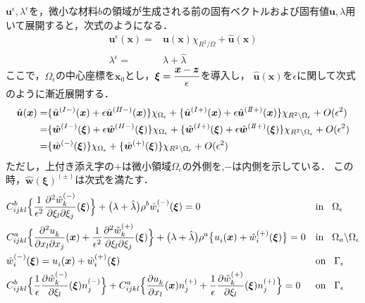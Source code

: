 $\bm{u}^{\epsilon},\lambda^{\epsilon}$を，微小な材料$b$の領域が生成される前の固有ベクトルおよび固有値$\bm{u},\lambda$用いて展開すると，次式のようになる．
\begin{align}
	\bm{u}^{\epsilon}(\bm{x})=&\bm{u}(\bm{x})\chi_{R^2/\Omega}+\hat{\bm{u}}(\bm{x})
	\\
	\lambda^{\epsilon}=&\lambda+\hat{\lambda}
\end{align}
ここで，$\Omega_\epsilon$の中心座標を$\bm{x}_0$とし，$\bm{\xi}=\displaystyle\frac{\bm{x}-\bm{z}}{\epsilon}$を導入し，
$\hat{\bm{u}}(\bm{x})$を$\epsilon$に関して次式のように漸近展開する．
\begin{align}
	\hat{\bm{u}}(\bm{x})
	=&\{\hat{\bm{u}}^{(I-)}(\bm{x})+\epsilon\hat{\bm{u}}^{(I\hspace{-.1em}I-)}(\bm{x})\}\chi_{\Omega_\epsilon}
	+\{\hat{\bm{u}}^{(I+)}(\bm{x})+\epsilon\hat{\bm{u}}^{(I\hspace{-.2em}I+)}(\bm{x})\}\chi_{R^2\backslash\Omega_\epsilon}+O(\epsilon^2)
	\nonumber
	\\
	=&\{\hat{\bm{w}}^{(I-)}(\bm{\xi})+\epsilon\hat{\bm{w}}^{(I\hspace{-.1em}I-)}(\bm{\xi})\}\chi_{\Omega_\epsilon}
	+\{\hat{\bm{w}}^{(I+)}(\bm{\xi})+\epsilon\hat{\bm{w}}^{(I\hspace{-.2em}I+)}(\bm{\xi})\}\chi_{R^2\backslash\Omega_\epsilon}+O(\epsilon^2)
	\nonumber
	\\
	=&\{\hat{\bm{w}}^{(-)}(\bm{\xi})\}\chi_{\Omega_\epsilon}
	+\{\hat{\bm{w}}^{(+)}(\bm{\xi})\}\chi_{R^2\backslash\Omega_\epsilon}+O(\epsilon^2)
\end{align}
ただし，上付き添え字の$+$は微小領域$\Omega_{\epsilon}$の外側を,$-$は内側を示している．
この時，$\hat{\bm{w}}(\bm{\xi})^{(\pm)}$は次式を満たす．
\begin{align}
	&C_{ijkl}^{b} \Bigl \{ \frac{1}{\epsilon^2}\frac{\partial^2 \hat{w}^{(-)}_{k}} {\partial \xi_l \partial \xi_j}(\bm{\xi})\Bigr \}
	+\bigl( \lambda+\hat{\lambda}\bigr) \rho^{b} 
	 \hat{w}_{i}^{(-)}(\bm{\xi})=0
	&&\text{in}\hspace{0.3cm}\Omega_{\epsilon}
	\label{eq:GovEpsIn}
	\\
	&C_{ijkl}^{a} \Bigl \{ \frac{\partial^2 u^{}_{k}} {\partial x_l \partial x_j}(\bm{x})
	+\frac{1}{\epsilon^2}\frac{\partial^2 \hat{w}^{(+)}_{k}} {\partial \xi_l \partial \xi_j}(\bm{\xi})\Bigr \}
	+\bigl( \lambda+\hat{\lambda}\bigr) \rho^{a}
	\bigl \{ u_{i}^{}(\bm{x})+\hat{w}_{i}^{(+)}(\bm{\xi})\bigr \}=0
	&&\text{in}\hspace{0.3cm}\Omega_{a}\backslash\Omega_{\epsilon}
	\label{eq:GovEpsOut}
	\\
	&\hat{w}_{i}^{(-)}(\bm{\xi})=u_{i}^{}(\bm{x})+\hat{w}_{i}^{(+)}(\bm{\xi})
	&&\text{on}\hspace{0.3cm}\Gamma_{\epsilon}
	\\
	&C_{ijkl}^{b} \Bigl \{ \frac{1}{\epsilon}\frac{\partial \hat{w}^{(-)}_{k}} {\partial \xi_l}(\bm{\xi}) n_{j}^{(-)} \Bigr \}
	+C_{ijkl}^{a} \Bigl \{ \frac{\partial u^{}_{k}} {\partial x_l}(\bm{x})n_{j}^{(+)}
	+\frac{1}{\epsilon}\frac{\partial \hat{w}^{(+)}_{k}} {\partial \xi_l}(\bm{\xi}) n_{j}^{(+)} \Bigr \}
	=0
	&&\text{on}\hspace{0.3cm}\Gamma_{\epsilon}
	\label{eq:GovEpsBC}
\end{align}
